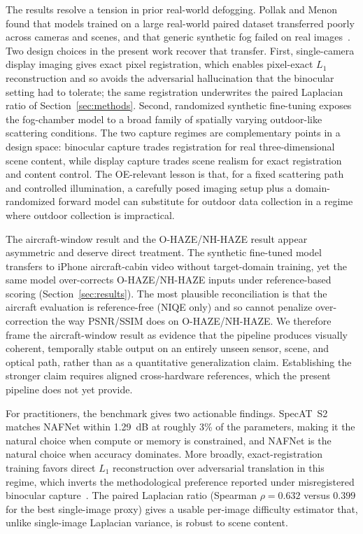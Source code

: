 \documentclass{optica-article}
\begin{document}
The results resolve a tension in prior real-world defogging.
Pollak and Menon found that models trained on a large real-world
paired dataset transferred poorly across cameras and scenes, and
that generic synthetic fog failed on real
images~\cite{pollak2024stereofog}. Two design choices in the present
work recover that transfer. First, single-camera display imaging
gives exact pixel registration, which enables pixel-exact
$L_1$ reconstruction and so avoids the adversarial hallucination
that the binocular setting had to tolerate; the same registration
underwrites the paired Laplacian ratio of Section~\ref{sec:methods}.
Second,  randomized synthetic fine-tuning exposes the fog-chamber
model to a broad family of spatially varying outdoor-like
scattering conditions. The two capture regimes
are complementary points in a design space: binocular capture trades
registration for real three-dimensional scene content, while display
capture trades scene realism for exact registration and content
control. The OE-relevant lesson is that, for a fixed scattering
path and controlled illumination, a carefully posed imaging setup
plus a domain-randomized forward model can substitute for outdoor data
collection in a regime where outdoor collection is impractical.

The aircraft-window result and the O-HAZE/NH-HAZE result appear
asymmetric and deserve direct treatment. The synthetic fine-tuned
model transfers to iPhone aircraft-cabin video without target-domain
training, yet the same model over-corrects O-HAZE/NH-HAZE inputs
under reference-based scoring (Section~\ref{sec:results}). The
most plausible reconciliation is that the aircraft evaluation is
reference-free (NIQE only) and so cannot penalize over-correction
the way PSNR/SSIM does on O-HAZE/NH-HAZE. We therefore frame the
aircraft-window result as evidence that the pipeline produces
visually coherent, temporally stable output on an entirely unseen
sensor, scene, and optical path, rather than as a quantitative
generalization claim. Establishing the stronger claim requires
aligned cross-hardware references, which the present pipeline does
not yet provide.

For practitioners, the benchmark gives two actionable findings.
SpecAT~S2 matches NAFNet within 1.29~dB at roughly 3\% of the
parameters, making it the natural choice when compute or memory is
constrained, and NAFNet is the natural choice when accuracy
dominates. More broadly, exact-registration training favors direct
$L_1$ reconstruction over adversarial translation in this regime,
which inverts the methodological preference reported under
misregistered binocular capture~\cite{pollak2024stereofog}. The
paired Laplacian ratio (Spearman $\rho = 0.632$ versus $0.399$ for
the best single-image proxy) gives a usable per-image difficulty
estimator that, unlike single-image Laplacian variance, is robust
to scene content.
\end{document}
